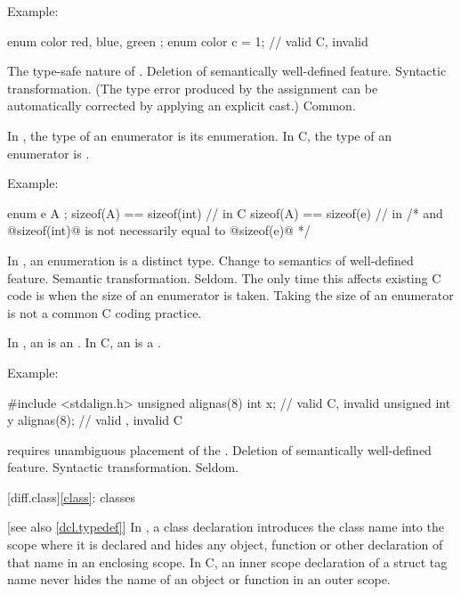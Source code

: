 Example:
\begin{codeblock}
enum color { red, blue, green };
enum color c = 1;               // valid C, invalid \Cpp{}
\end{codeblock}

\rationale
The type-safe nature of \Cpp{}.
\effect
Deletion of semantically well-defined feature.
\difficulty
Syntactic transformation.
(The type error produced by the assignment can be automatically
corrected by applying an explicit cast.)
\howwide
Common.

\change
In \Cpp{}, the type of an enumerator is its enumeration. In C, the type of an enumerator is .

Example:
\begin{codeblock}
enum e { A };
sizeof(A) == sizeof(int)        // in C
sizeof(A) == sizeof(e)          // in \Cpp{}
/* and @sizeof(int)@ is not necessarily equal to @sizeof(e)@ */
\end{codeblock}

\rationale
In \Cpp{}, an enumeration is a distinct type.
\effect
Change to semantics of well-defined feature.
\difficulty
Semantic transformation.
\howwide
Seldom.
The only time this affects existing C code is when the size of an
enumerator is taken.
Taking the size of an enumerator is not a
common C coding practice.

\change
In \Cpp{},
an  is an .
In C, an  is a .

Example:
\begin{codeblock}
#include <stdalign.h>
unsigned alignas(8) int x;      // valid C, invalid \Cpp{}
unsigned int y alignas(8);      // valid \Cpp{}, invalid C
\end{codeblock}
\rationale
\Cpp{} requires unambiguous placement of the .
\effect
Deletion of semantically well-defined feature.
\difficulty
Syntactic transformation.
\howwide
Seldom.

[diff.class]{\ref{class}: classes}

 [see also \ref{dcl.typedef}]
\change
In \Cpp{}, a class declaration introduces the class name into the scope where it is
declared and hides any object, function or other declaration of that name in an enclosing
scope. In C, an inner scope declaration of a struct tag name never hides the name of an
object or function in an outer scope.

